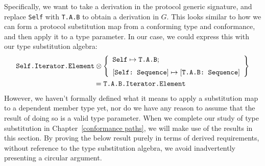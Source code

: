 \documentclass[../generics]{subfiles}
\begin{document}
Specifically, we want to take a derivation in the protocol generic signature, and replace \texttt{Self} with \texttt{T.A.B} to obtain a derivation in $G$. This looks similar to how we can form a protocol substitution map from a conforming type and conformance, and then apply it to a type parameter. In our case, we could express this with our type substitution algebra:
\begin{gather*}
\texttt{Self.Iterator.Element}\otimes\SubstMapLongC{\SubstType{Self}{T.A.B}}{\SubstConf{Self}{T.A.B}{Sequence}}\\
\qquad {} = \texttt{T.A.B.Iterator.Element}
\end{gather*}
However, we haven't formally defined what it means to apply a substitution map to a dependent member type yet, nor do we have any reason to assume that the result of doing so is a valid type parameter. When we complete our study of type substitution in Chapter~\ref{conformance paths}, we will make use of the results in this section. By proving the below result purely in terms of derived requirements, without reference to the type substitution algebra, we avoid inadvertently presenting a circular argument.
\end{document}
